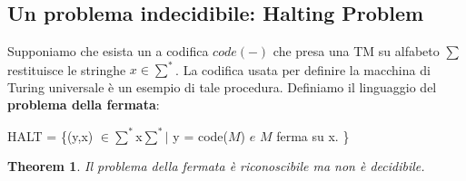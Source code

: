\documentclass[a4paper, 12pt]{article}
\newtheorem{theorem}{Theorem}[section]
\begin{document}
\subsection{Un problema indecidibile: Halting Problem}
Supponiamo che esista un a codifica $code(-)$ che presa una TM su alfabeto $\sum$ restituisce le stringhe $x \in \sum^*$. La codifica usata per definire la macchina di Turing universale \`e un esempio di tale procedura.
Definiamo il linguaggio del \textbf{problema della fermata}:
\begin{center}
HALT = \{(y,x) $\in \sum^*$x$\sum^*|$ y = code($M$) $e$ $M$ ferma su x. \}
\end{center} 
\begin{theorem}
\label{th:1}
Il problema della fermata \`e riconoscibile ma non \`e decidibile.
\end{theorem}
\end{document}
